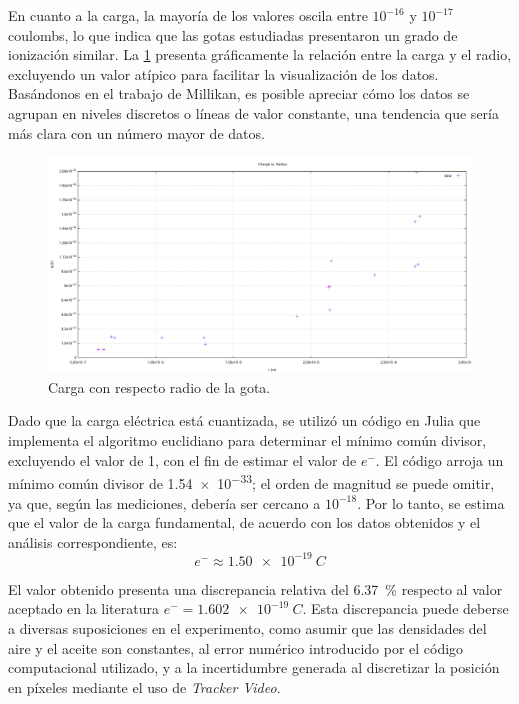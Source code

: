 En cuanto a la carga, la mayoría de los valores oscila entre \(10^{-16}\) y
\(10^{-17}\) coulombs, lo que indica que las gotas estudiadas presentaron un
grado de ionización similar.
La \cref{fig:plot-radius-charge} presenta gráficamente la relación entre la
carga y el radio, excluyendo un valor atípico para facilitar la visualización
de los datos.
Basándonos en el trabajo de Millikan, es posible apreciar cómo los datos se
agrupan en niveles discretos o líneas de valor constante, una tendencia que
sería más clara con un número mayor de datos.

\begin{figure}[H]
	\centering
	\includegraphics[width=\linewidth]{./images/plot-radius-charge.pdf}
	\caption{Carga con respecto radio de la gota.}
	\label{fig:plot-radius-charge}
\end{figure}


Dado que la carga eléctrica está cuantizada, se utilizó un código en Julia que
implementa el algoritmo euclidiano para determinar el mínimo común divisor,
excluyendo el valor de 1, con el fin de estimar el valor de \(e^{-}\).
El código arroja un mínimo común divisor de \num{1.54e-33}; el orden de magnitud
se puede omitir, ya que, según las mediciones, debería ser cercano a \(10^{-18}\).
Por lo tanto, se estima que el valor de la carga fundamental, de acuerdo con
los datos obtenidos y el análisis correspondiente, es:
\begin{equation}
	e^- \approx \qty{1.50e-19}{C}
\end{equation}

El valor obtenido presenta una discrepancia relativa del \qty{6.37}{\percent} respecto
al valor aceptado en la literatura \(e^{-} = \qty{1.602e-19}{C}\).
Esta discrepancia puede deberse a diversas suposiciones en el experimento, como
asumir que las densidades del aire y el aceite son constantes, al error numérico
introducido por el código computacional utilizado, y a la incertidumbre generada
al discretizar la posición en píxeles mediante el uso de \emph{Tracker Video}.
